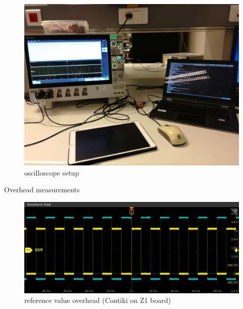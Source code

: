 \documentclass{beamer}
\begin{document}

\begin{frame}

\begin{figure}
\centering
\includegraphics[scale=0.1]{assets/1.jpg}
\caption{oscilloscope setup}
\end{figure}

\end{frame}


\begin{frame}{Overhead measurements}
  \protect\hypertarget{overhead-measurements}{}
  \begin{figure}
    \includegraphics[scale=0.4]{assets/reference-value-overhead-contiki-z1.png}
    \caption{reference value overhead (Contiki on Z1 board)}
  \end{figure}
\end{frame}
  
  
\end{document}
